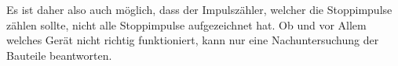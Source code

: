 Es ist daher also auch möglich, dass der Impulszähler, welcher die Stoppimpulse zählen sollte, nicht alle Stoppimpulse aufgezeichnet hat.
Ob und vor Allem welches Gerät nicht richtig funktioniert, kann nur eine Nachuntersuchung der Bauteile beantworten.
